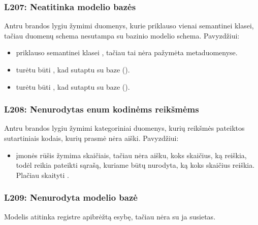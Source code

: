 \documentclass[letterpaper,10pt,lithuanian]{sphinxmanual}
\begin{document}
\subsubsection{L207: Neatitinka modelio bazės}
\label{\detokenize{branda:l207-neatitinka-modelio-bazes}}\label{\detokenize{branda:l207}}
\sphinxAtStartPar
Antru brandos lygiu žymimi duomenys, kurie priklauso vienai semantinei klasei,
tačiau duomenų schema nesutampa su bazinio modelio schema. Pavyzdžiui:
\begin{itemize}
\item {} 
\sphinxAtStartPar
{} \sphinxhyphen{} priklauso semantinei klasei , tačiau tai nėra
pažymėta metaduomenyse.

\item {} 
\sphinxAtStartPar
{} turėtu būti , kad sutaptu su baze
().

\item {} 
\sphinxAtStartPar
{} turėtu būti , kad sutaptu su
baze ().

\end{itemize}


\subsubsection{L208: Nenurodytas enum kodinėms reikšmėms}
\label{\detokenize{branda:l208-nenurodytas-enum-kodinems-reiksmems}}\label{\detokenize{branda:l208}}
\sphinxAtStartPar
Antru brandos lygiu žymimi kategoriniai duomenys, kurių reikšmės pateiktos
sutartiniais kodais, kurių prasmė nėra aiški. Pavyzdžiui:
\begin{itemize}
\item {} 
\sphinxAtStartPar
{} \sphinxhyphen{} įmonės rūšis žymima skaičiais, tačiau nėra aišku,
koks skaičius, ką reiškia, todėl reikia pateikti  sąrašą,
kuriame būtų nurodyta, ką koks skaičius reiškia. Plačiau skaityti
{\hyperref[\detokenize{dimensijos:enum}]{}}.

\end{itemize}


\subsubsection{L209: Nenurodyta modelio bazė}
\label{\detokenize{branda:l209-nenurodyta-modelio-baze}}\label{\detokenize{branda:l209}}
\sphinxAtStartPar
Modelis atitinka registre apibrėžtą esybę, tačiau nėra su ja susietas.
\end{document}
